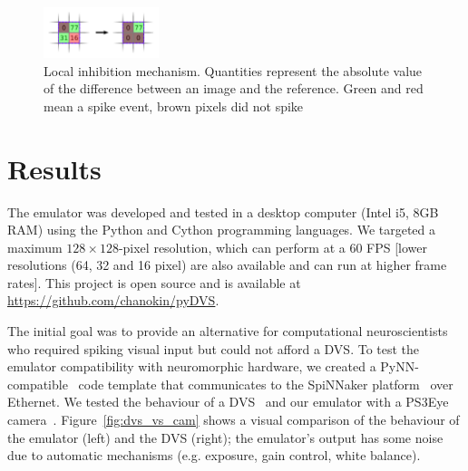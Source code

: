 \documentclass[conference]{IEEEtran}
\begin{document}
\begin{figure}[htb]
\centering
    \includegraphics[width=0.3\textwidth]{inh_local_max_img}
    \caption{Local inhibition mechanism. Quantities represent the absolute value of the difference between an image and the reference. Green and red mean a spike event, brown pixels did not spike}

  \label{fig:local_inh}
\end{figure}

\section{Results}
\label{sec:results}
The emulator was developed and tested in a desktop computer (Intel i5, 8GB RAM) using the Python and Cython programming languages. We targeted a maximum $128\times 128$-pixel resolution, which can perform at a 60 FPS [lower resolutions (64, 32 and 16 pixel) are also available and can run at higher frame rates]. This project is open source and is available at \url{https://github.com/chanokin/pyDVS}.

The initial goal was to provide an alternative for computational neuroscientists who required spiking visual input but could not afford a DVS. To test the emulator compatibility with neuromorphic hardware, we created a PyNN-compatible~\cite{pynn} code template that communicates to the SpiNNaker platform~\cite{spinnakerOverview} over Ethernet. We tested the behaviour of a DVS~\cite{bernabeDVS} and our emulator with a PS3Eye camera~\cite{wikipedia:ps3eye}. Figure~\ref{fig:dvs_vs_cam} shows a visual comparison of the behaviour of the emulator (left) and the DVS (right); the emulator's output has some noise due to automatic mechanisms (e.g. exposure, gain control, white balance).
\end{document}
